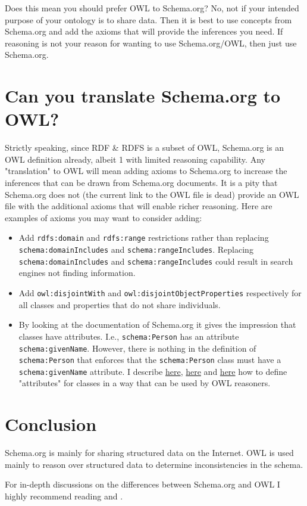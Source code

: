 \documentclass{amsart}
\begin{document}
	Does this mean you should prefer OWL to Schema.org? No, not if your intended purpose of your ontology is to share data. Then it is best to use concepts from Schema.org and add the axioms that will provide the inferences you need. If reasoning is not your reason for wanting to use Schema.org/OWL, then just use Schema.org.
   
    \section{Can you translate Schema.org to OWL?}
    Strictly speaking, since RDF \& RDFS is a subset of OWL, Schema.org is an OWL definition already, albeit 1 with limited reasoning capability. Any "translation" to OWL will mean adding axioms to Schema.org to increase the inferences that can be drawn from Schema.org documents. It is a pity that Schema.org does not (the current link to the OWL file is dead) provide an OWL file with the additional axioms that will enable richer reasoning. Here are examples of axioms you may want to consider adding:
    
    \begin{itemize}
    	\item Add \texttt{rdfs:domain} and \texttt{rdfs:range} restrictions rather than replacing \texttt{schema:domainIncludes} and \texttt{schema:rangeIncludes}. Replacing \texttt{schema:domainIncludes} and \texttt{schema:rangeIncludes} could result in search engines not finding information.
    	\item Add \texttt{owl:disjointWith} and \texttt{owl:disjointObjectProperties} respectively for all classes and properties that do not share individuals.
    	\item By looking at the documentation of Schema.org it gives the impression that classes have attributes. I.e., \texttt{schema:Person} has an attribute \texttt{schema:givenName}. However, there is nothing in the definition of \texttt{schema:Person} that enforces that the \texttt{schema:Person} class must have a \texttt{schema:givenName} attribute. I describe \href{https://henrietteharmse.com/2017/09/09/a-simple-class/}{here}, \href{https://henrietteharmse.com/2017/09/10/add-some-more-attributes/}{here} and \href{https://henrietteharmse.com/2017/11/03/associations-between-classes/}{here} how to define "attributes" for classes in a way that can be used by OWL reasoners. 	
    \end{itemize}

	\section{Conclusion}
	Schema.org is mainly for sharing structured data on the Internet. OWL is used mainly to reason over structured data to determine inconsistencies in the schema.
  	
  	For in-depth discussions on the differences between Schema.org and OWL I highly recommend reading \cite{10.1007/978-3-319-11964-9_17} and \cite{hernich2015schema}.
  
  
  
 
\end{document}
